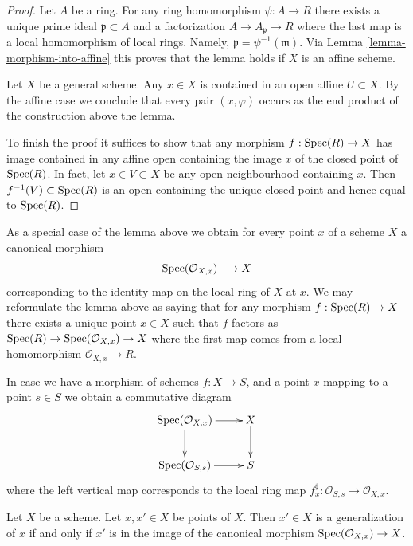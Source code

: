 \begin{proof}
Let $A$ be a ring. For any ring homomorphism $\psi : A \to R$
there exists a unique prime ideal $\mathfrak p \subset A$
and a factorization $A \to A_{\mathfrak p} \to R$ where the
last map is a local homomorphism of local rings. Namely,
$\mathfrak p = \psi^{-1}(\mathfrak m)$. Via
Lemma \ref{lemma-morphism-into-affine}
this proves that the lemma holds if $X$ is an affine scheme.

\medskip\noindent
Let $X$ be a general scheme. Any $x \in X$ is contained in
an open affine $U \subset X$. By the affine case we conclude that every pair
$(x, \varphi)$ occurs as the end product of the construction
above the lemma.

\medskip\noindent
To finish the proof it suffices to show that any morphism
$f : \mathop{\mathrm{Spec}}(R) \to X$ has image contained in any affine
open containing the image $x$ of the closed
point of $\mathop{\mathrm{Spec}}(R)$. In fact, let $x \in V \subset X$
be any open neighbourhood containing $x$. Then
$f^{-1}(V) \subset \mathop{\mathrm{Spec}}(R)$ is an open containing
the unique closed point and hence equal to $\mathop{\mathrm{Spec}}(R)$.
\end{proof}

\noindent
As a special case of the lemma above we obtain for every
point $x$ of a scheme $X$ a canonical morphism
\begin{equation}
\label{equation-canonical-morphism}
\mathop{\mathrm{Spec}}(\mathcal{O}_{X, x}) \longrightarrow X
\end{equation}
corresponding to the identity map on the local ring of $X$ at $x$.
We may reformulate the lemma above as saying that for any
morphism $f : \mathop{\mathrm{Spec}}(R) \to X$ there exists a unique point
$x \in X$ such that $f$ factors as
$\mathop{\mathrm{Spec}}(R) \to \mathop{\mathrm{Spec}}(\mathcal{O}_{X, x}) \to X$
where the first map comes from a local homomorphism
$\mathcal{O}_{X, x} \to R$.

\medskip\noindent
In case we have a morphism of schemes $f : X \to S$,
and a point $x$ mapping to a point $s \in S$ we obtain
a commutative diagram
$$
\xymatrix{
\Spec(\mathcal{O}_{X, x}) \ar[r] \ar[d] & X \ar[d] \\
\Spec(\mathcal{O}_{S, s}) \ar[r] & S
}
$$
where the left vertical map corresponds to the local ring map
$f^\sharp_x : \mathcal{O}_{S, s} \to \mathcal{O}_{X, x}$.

\begin{lemma}
\label{lemma-specialize-points}
Let $X$ be a scheme.
Let $x, x' \in X$ be points of $X$.
Then $x' \in X$ is a generalization of $x$ if and only if
$x'$ is in the image of the canonical morphism
$\mathop{\mathrm{Spec}}(\mathcal{O}_{X, x}) \to X$.
\end{lemma}

